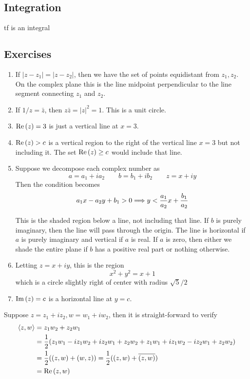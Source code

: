 \newpage 
\subsection{Integration}
tf is an integral

\newpage 
\subsection{Exercises}
\begin{exercise} \hfill
	\begin{enumerate}[label=\alph*)]
		\item If $|z - z_1| = |z - z_2|$, then we have the set of points equidistant from $z_1, z_2$. On the complex plane this is the line midpoint perpendicular to the line segment connecting $z_1$ and $z_2$. 
		\item If $1/z = \bar z$, then $z\bar z = |z|^2 = 1$. This is a unit circle.
		\item $\Re\left(z\right) = 3$ is just a vertical line at $x = 3$.
		\item $\Re\left(z\right) > c$ is a vertical region to the right of the vertical line $x = 3$ but not including it. The set $\Re\left(z\right) \geq c$ would include that line.
		\item Suppose we decompose each complex number as
		\[ a = a_1 + i a_2 \qquad b = b_1 + i b_2 \qquad z = x + i y \]
		Then the condition becomes
		\[ a_1 x - a_2 y + b_1 > 0 \Longrightarrow y < \frac{a_1}{a_2} x + \frac{b_1}{a_2} \]
		
		This is the shaded region below a line, not including that line. If $b$ is purely imaginary, then the line will pass through the origin. The line is horizontal if $a$ is purely imaginary and vertical if $a$ is real. If $a$ is zero, then either we shade the entire plane if $b$ has a positive real part or nothing otherwise.
		\item Letting $z = x + iy$, this is the region
		\[ x^2 + y^2 = x + 1 \]
		which is a circle slightly right of center with radius $\sqrt{5}/2$
		\item $\Im\left(z\right) = c$ is a horizontal line at $y = c$.
	\end{enumerate}
\end{exercise}

\begin{exercise}
	Suppose $z = z_1 + iz_2, w = w_1 + iw_2$, then it is straight-forward to verify
	\begin{align*}
		\left\langle z,w \right\rangle &= z_1 w_2 + z_2 w_1 \\
		&= \frac{1}{2}( z_1w_1 - iz_1w_2 + iz_2w_1 + z_2w_2 + z_1w_1 + iz_1w_2 - iz_2w_1 + z_2w_2 ) \\
		&= \frac{1}{2}( (z,w) + (w,z) ) = \frac{1}{2}( (z,w) + \overline{(z,w)} ) \\
		&= \Re\left(z,w\right)
	\end{align*}
\end{exercise}

